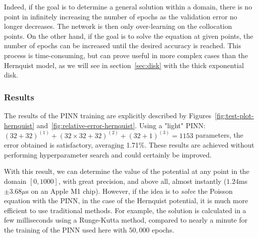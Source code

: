 Indeed, if the goal is to determine a general solution within a domain, there is no point in infinitely increasing the number of epochs as the validation error no longer decreases. The network is then only over-learning on the collocation points. On the other hand, if the goal is to solve the equation at given points, the number of epochs can be increased until the desired accuracy is reached. This process is time-consuming, but can prove useful in more complex cases than the Hernquist model, as we will see in section~\ref{sec:disk} with the thick exponential disk.

\subsubsection{Results}

The results of the PINN training are explicitly described by Figures~\ref{fig:test-plot-hernquist} and~\ref{fig:relative-error-hernquist}. Using a "light" PINN: $(32 + 32)^{(1)} + (32 \times 32 + 32)^{(2)} + (32 + 1)^{(3)} = 1153$ parameters, the error obtained is satisfactory, averaging 1.71\%. These results are achieved without performing hyperparameter search and could certainly be improved.

With this result, we can determine the value of the potential at any point in the domain $[0, 1000]$, with great precision, and above all, almost instantly ($1.24$ms $\pm 3.68 \mu $s on an Apple M1 chip). However, if the idea is to \emph{solve} the Poisson equation with the PINN, in the case of the Hernquist potential, it is much more efficient to use traditional methods. For example, the solution is calculated in a few milliseconds using a Runge-Kutta method, compared to nearly a minute for the training of the PINN used here with $50,000$ epochs.

